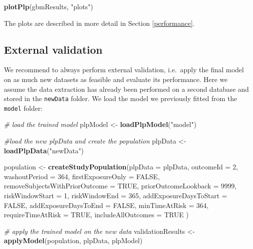 \documentclass[11pt]{book}
\newenvironment{Shaded}{\begin{snugshade}}{\end{snugshade}}
\newcommand{\CommentTok}[1]{\textcolor[rgb]{0.56,0.35,0.01}{\textit{#1}}}
\newcommand{\DataTypeTok}[1]{\textcolor[rgb]{0.13,0.29,0.53}{#1}}
\newcommand{\DecValTok}[1]{\textcolor[rgb]{0.00,0.00,0.81}{#1}}
\newcommand{\KeywordTok}[1]{\textcolor[rgb]{0.13,0.29,0.53}{\textbf{#1}}}
\newcommand{\NormalTok}[1]{#1}
\newcommand{\OtherTok}[1]{\textcolor[rgb]{0.56,0.35,0.01}{#1}}
\newcommand{\StringTok}[1]{\textcolor[rgb]{0.31,0.60,0.02}{#1}}
\theoremstyle{definition}
\theoremstyle{definition}
\theoremstyle{definition}
\theoremstyle{remark}
\begin{document}
\begin{Shaded}
\begin{Highlighting}[]
\KeywordTok{plotPlp}\NormalTok{(gbmResults, }\StringTok{"plots"}\NormalTok{)}
\end{Highlighting}
\end{Shaded}

The plots are described in more detail in Section \ref{performance}.

\hypertarget{external-validation}{%
\subsection{External validation}\label{external-validation}}

We recommend to always perform external validation, i.e.~apply the final model on as much new datasets as feasible and evaluate its performance. Here we assume the data extraction has already been performed on a second database and stored in the \texttt{newData} folder. We load the model we previously fitted from the \texttt{model} folder:

\begin{Shaded}
\begin{Highlighting}[]
\CommentTok{# load the trained model}
\NormalTok{plpModel <-}\StringTok{ }\KeywordTok{loadPlpModel}\NormalTok{(}\StringTok{"model"}\NormalTok{)}

\CommentTok{#load the new plpData and create the population}
\NormalTok{plpData <-}\StringTok{ }\KeywordTok{loadPlpData}\NormalTok{(}\StringTok{"newData"}\NormalTok{)}

\NormalTok{population <-}\StringTok{ }\KeywordTok{createStudyPopulation}\NormalTok{(}\DataTypeTok{plpData =}\NormalTok{ plpData,}
                                    \DataTypeTok{outcomeId =} \DecValTok{2}\NormalTok{,}
                                    \DataTypeTok{washoutPeriod =} \DecValTok{364}\NormalTok{,}
                                    \DataTypeTok{firstExposureOnly =} \OtherTok{FALSE}\NormalTok{,}
                                    \DataTypeTok{removeSubjectsWithPriorOutcome =} \OtherTok{TRUE}\NormalTok{,}
                                    \DataTypeTok{priorOutcomeLookback =} \DecValTok{9999}\NormalTok{,}
                                    \DataTypeTok{riskWindowStart =} \DecValTok{1}\NormalTok{,}
                                    \DataTypeTok{riskWindowEnd =} \DecValTok{365}\NormalTok{,}
                                    \DataTypeTok{addExposureDaysToStart =} \OtherTok{FALSE}\NormalTok{,}
                                    \DataTypeTok{addExposureDaysToEnd =} \OtherTok{FALSE}\NormalTok{,}
                                    \DataTypeTok{minTimeAtRisk =} \DecValTok{364}\NormalTok{,}
                                    \DataTypeTok{requireTimeAtRisk =} \OtherTok{TRUE}\NormalTok{,}
                                    \DataTypeTok{includeAllOutcomes =} \OtherTok{TRUE}
\NormalTok{)}

\CommentTok{# apply the trained model on the new data}
\NormalTok{validationResults <-}\StringTok{ }\KeywordTok{applyModel}\NormalTok{(population, plpData, plpModel)}
\end{Highlighting}
\end{Shaded}
\end{document}
